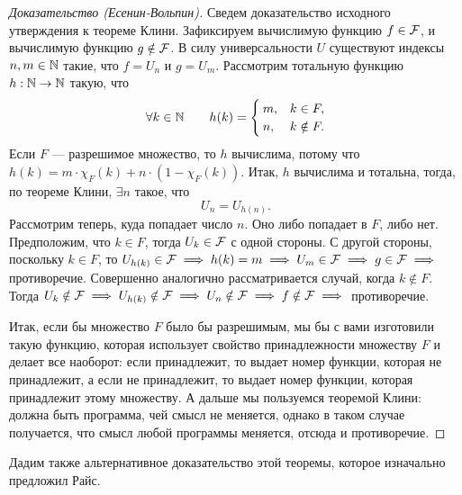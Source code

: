 \begin{proof}[Доказательство (Есенин-Вольпин)]
    Сведем доказательство исходного утверждения к теореме Клини.
    Зафиксируем вычислимую функцию $f \in \mathcal{F}$, и вычислимую функцию $g \notin \mathcal{F}$.
    В силу универсальности $U$ существуют индексы $n, m \in \mathbb{N}$ такие, что $f = U_{n}$ и $g = U_{m}$.
    Рассмотрим тотальную функцию $h: \mathbb{N} \to \mathbb{N}$ такую, что
    $$
        \forall k \in \mathbb{N} \qquad h(k) = \begin{cases}
            m, & k \in F, \\
            n, & k \notin F.
        \end{cases}
    $$
    Если $F$ --- разрешимое множество, то $h$ вычислима, потому что $h(k) = m \cdot \chi_{F}\left(k\right) + n \cdot \left(1 - \chi_{F}\left(k\right)\right)$.
    Итак, $h$ вычислима и тотальна, тогда, по теореме Клини, $\exists n$ такое, что
    $$
        U_{n} = U_{h(n)}.
    $$
    Рассмотрим теперь, куда попадает число $n$.
    Оно либо попадает в $F$, либо нет.
    Предположим, что $k \in F$, тогда $U_{k} \in \mathcal{F}$ с одной стороны.
    С другой стороны, поскольку $k \in F$, то $U_{h(k)} \in \mathcal{F} \implies h(k) = m \implies U_{m} \in \mathcal{F} \implies g \in \mathcal{F} \implies$ противоречие.
    Совершенно аналогично рассматривается случай, когда $k \notin F$.
    Тогда $U_{k} \notin \mathcal{F} \implies U_{h(k)} \notin \mathcal{F} \implies U_{n} \notin \mathcal{F} \implies f \notin \mathcal{F} \implies$ противоречие.

    Итак, если бы множество $F$ было бы разрешимым, мы бы с вами изготовили такую функцию, которая использует свойство принадлежности множеству $F$ и делает все наоборот: если принадлежит, то выдает номер функции, которая не принадлежит, а если не принадлежит, то выдает номер функции, которая принадлежит этому множеству.
    А дальше мы пользуемся теоремой Клини: должна быть программа, чей смысл не меняется, однако в таком случае получается, что смысл любой программы меняется, отсюда и противоречие.
\end{proof}

Дадим также альтернативное доказательство этой теоремы, которое изначально предложил Райс.

